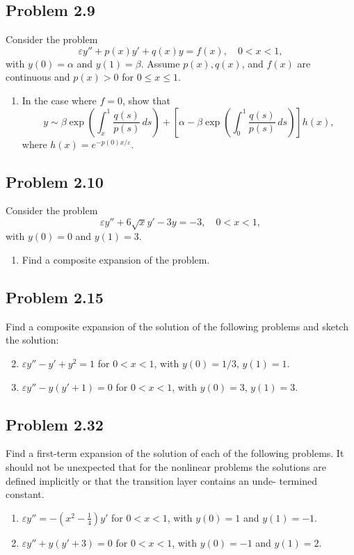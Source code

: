 \documentclass[11pt]{amsart}
\begin{document}
\subsection*{Problem 2.9}
Consider the problem
\[
\varepsilon y'' + p(x)y' + q(x)y = f(x), \quad 0 < x < 1,
\]
with $y(0) = \alpha$ and $y(1) = \beta$. Assume $p(x), q(x)$, and $f(x)$ are
continuous and $p(x) > 0$ for $0 \le x \le 1$.
\begin{enumerate}[label=(\alph*)]
  \item In the case where $f = 0$, show that
  \[
  y \sim \beta \exp\left( \int_x^1 \frac{q(s)}{p(s)}\, ds \right) + \left[
  \alpha - \beta \exp\left( \int_0^1 \frac{q(s)}{p(s)}\, ds \right) \right]
  h(x),
  \]
  where $h(x) = e^{-p(0)x/\varepsilon}$.
\end{enumerate}

\subsection*{Problem 2.10}
Consider the problem
\[
\varepsilon y'' + 6\sqrt{x}y' - 3y = -3, \quad 0 < x < 1,
\]
with $y(0) = 0$ and $y(1) = 3$.
\begin{enumerate}[label=(\alph*)]
  \item Find a composite expansion of the problem.
\end{enumerate}

\subsection*{Problem 2.15}
Find a composite expansion of the solution of the following problems
and sketch the solution:
\begin{enumerate}[label=(\alph*)]
  \setcounter{enumi}{1}
  \item $\varepsilon y'' - y' + y^2 = 1$ for $0 < x < 1$, with $y(0) = 1/3$,
    $y(1) = 1$.
  
  \setcounter{enumi}{4}
  \item $\varepsilon y'' - y(y' + 1) = 0$ for $0 < x < 1$, with $y(0) = 3$,
    $y(1) = 3$.
\end{enumerate}

\subsection*{Problem 2.32}
Find a first-term expansion of the solution of each of the following
problems. It should not be unexpected that for the nonlinear problems the
solutions are defined implicitly or that the transition layer contains an unde-
termined constant.
\begin{enumerate}[label=(\alph*)]
  \item $\varepsilon y'' = -\left(x^2 - \tfrac{1}{4} \right)y'$ for $0 < x < 1$,
    with $y(0) = 1$ and $y(1) = -1$.

  \setcounter{enumi}{5}
  \item $\varepsilon y'' + y(y' + 3) = 0$ for $0 < x < 1$, with $y(0) = -1$ and
    $y(1) = 2$.
\end{enumerate}
\end{document}
